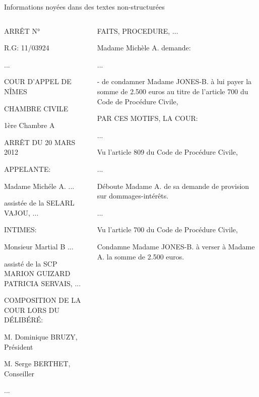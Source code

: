 \documentclass[newPxFont,pagenumber]{beamer}
\begin{document}
\begin{frame}{Informations noyées dans des textes non-structurées}
\scriptsize
\begin{columns}
\begin{column}{.50\linewidth}
ARRÊT N°

R.G: 11/03924

...

{COUR D'APPEL} DE {NÎMES}

{CHAMBRE CIVILE}

{1ère Chambre A}

ARRÊT DU {20 MARS 2012}

APPELANTE:

{Madame Michéle A.} ...

assistée de la {SELARL VAJOU}, ...

INTIMES:

{Monsieur Martial B} ...

assisté de la {SCP MARION GUIZARD PATRICIA SERVAIS}, ...

COMPOSITION DE LA COUR LORS DU DÉLIBÉRÉ:

{M. Dominique BRUZY, Président}

{M. Serge BERTHET, Conseiller}

...
\end{column}
\begin{column}{.50\linewidth}
FAITS, PROCEDURE, ...

Madame Michèle A. demande:

...

- de condamner Madame JONES-B. à lui payer la somme de {2.500 euros} au titre de l'{article 700 du Code de Procédure Civile}, 

\vspace{0.4cm}

PAR CES MOTIFS, LA COUR:

...

Vu l'{article 809 du Code de Procédure Civile},

...

{Déboute Madame A. de sa demande de provision sur dommages-intérêts.}

...

Vu l'{article 700 du Code de Procédure Civile},

Condamne Madame JONES-B. à verser à Madame A. la somme de {2.500 euros}.
\end{column}
\end{columns}
\end{frame}
\end{document}
